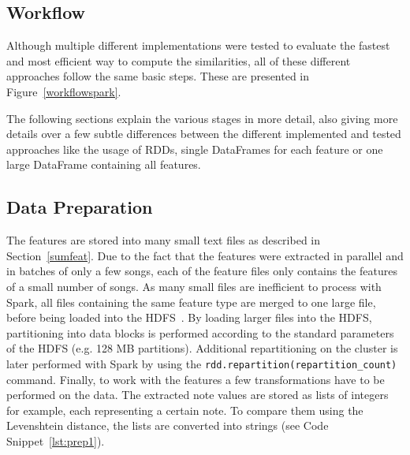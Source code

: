 \subsection{Workflow}

Although multiple different implementations were tested to evaluate the fastest and most efficient way to compute the similarities, all of these different approaches follow the same basic steps. These are presented in Figure~\ref{workflowspark}.  

\begin{figure}[htbp]
	\centering
\end{figure}
\FloatBarrier

\noindent The following sections explain the various stages in more detail, also giving more details over a few subtle differences between the different implemented and tested approaches like the usage of RDDs, single DataFrames for each feature or one large DataFrame containing all features. 

\subsection{Data Preparation}

The features are stored into many small text files as described in Section~\ref{sumfeat}. Due to the fact that the features were extracted in parallel and in batches of only a few songs, each of the feature files only contains the features of a small number of songs. As many small files are inefficient to process with Spark, all files containing the same feature type are merged to one large file, before being loaded into the HDFS~\cite[p. 153]{sparkbook1}. By loading larger files into the HDFS, partitioning into data blocks is performed according to the standard parameters of the HDFS (e.g. 128 MB partitions). Additional repartitioning on the cluster is later performed with Spark by using the \lstinline{rdd.repartition(repartition_count)} command. 
Finally, to work with the features a few transformations have to be performed on the data. The extracted note values are stored as lists of integers for example, each representing a certain note. To compare them using the Levenshtein distance, the lists are converted into strings (see Code Snippet~\ref{lst:prep1}). 

